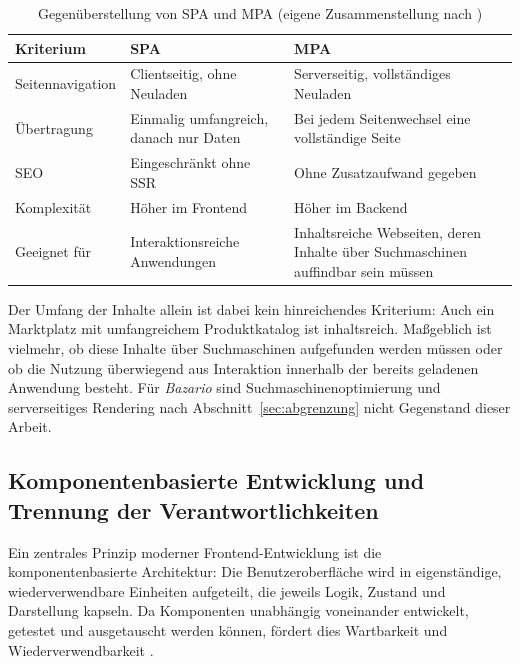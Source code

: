 \begin{table}[H]
\centering
\caption{Gegenüberstellung von \acs{SPA} und \acs{MPA} (eigene
Zusammenstellung nach \cite{bhalla_spa_architecture,
jonathan_react_spa})}
\label{tab:spa-mpa}
\begin{tabular}{|p{3.5cm}|p{4.5cm}|p{4.5cm}|}
\hline
\textbf{Kriterium} & \textbf{\acs{SPA}} & \textbf{\acs{MPA}} \\
\hline
Seitennavigation & Clientseitig, ohne Neuladen &
Serverseitig, vollständiges Neuladen \\
\hline
Übertragung & Einmalig umfangreich, danach nur Daten &
Bei jedem Seitenwechsel eine vollständige Seite \\
\hline
\acs{SEO} & Eingeschränkt ohne \acs{SSR} & Ohne Zusatzaufwand
gegeben \\
\hline
Komplexität & Höher im Frontend & Höher im Backend \\
\hline
Geeignet für & Interaktionsreiche Anwendungen &
Inhaltsreiche Webseiten, deren Inhalte über Suchmaschinen
auffindbar sein müssen \\
\hline
\end{tabular}
\end{table}

Der Umfang der Inhalte allein ist dabei kein hinreichendes
Kriterium: Auch ein Marktplatz mit umfangreichem Produktkatalog ist
inhaltsreich. Maßgeblich ist vielmehr, ob diese Inhalte über
Suchmaschinen aufgefunden werden müssen oder ob die Nutzung
überwiegend aus Interaktion innerhalb der bereits geladenen
Anwendung besteht. Für \textit{Bazario} sind Suchmaschinenoptimierung
und serverseitiges Rendering nach Abschnitt~\ref{sec:abgrenzung}
nicht Gegenstand dieser Arbeit.


\subsection{Komponentenbasierte Entwicklung und Trennung der
Verantwortlichkeiten}
\label{subsec:komponentenbasiert}

Ein zentrales Prinzip moderner Frontend-Entwicklung ist die
komponentenbasierte Architektur: Die Benutzeroberfläche wird in
eigenständige, wiederverwendbare Einheiten aufgeteilt, die jeweils
Logik, Zustand und Darstellung kapseln. Da Komponenten unabhängig
voneinander entwickelt, getestet und ausgetauscht werden können,
fördert dies Wartbarkeit und Wiederverwendbarkeit
\cite{ijlrp_react_components}.

